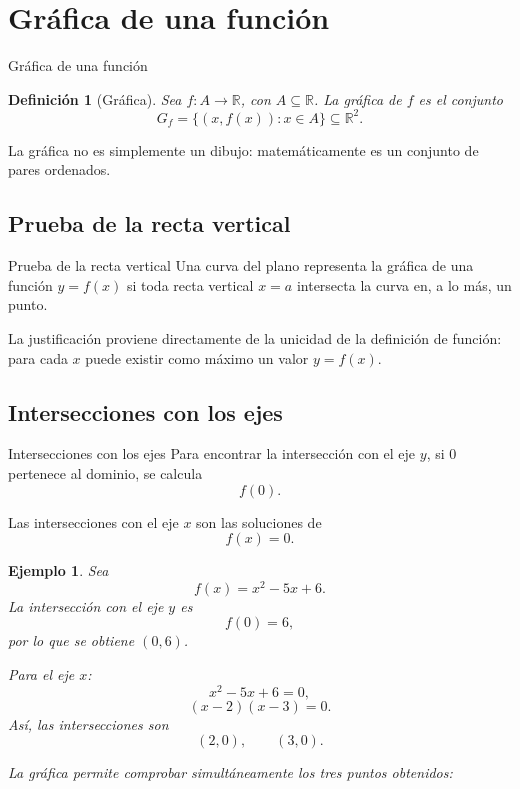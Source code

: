 \documentclass[aspectratio=169,10pt]{beamer}
\newtheorem{definicion}{Definición}
\newtheorem{ejemplo}{Ejemplo}
\newcommand{\R}{\mathbb{R}}
\begin{document}
\section{Gráfica de una función}
\begin{frame}{Gráfica de una función}
\begin{definicion}[Gráfica]
Sea $f:A\to\R$, con $A\subseteq\R$. La gráfica de $f$ es el conjunto
\[
G_f=\{(x,f(x)):x\in A\}\subseteq\R^2.
\]
\end{definicion}

La gráfica no es simplemente un dibujo: matemáticamente es un conjunto de
pares ordenados.
\end{frame}
\subsection*{Prueba de la recta vertical}
\begin{frame}{Prueba de la recta vertical}
Una curva del plano representa la gráfica de una función $y=f(x)$ si toda
recta vertical $x=a$ intersecta la curva en, a lo más, un punto.

La justificación proviene directamente de la unicidad de la definición de
función: para cada $x$ puede existir como máximo un valor $y=f(x)$.
\end{frame}
\subsection*{Intersecciones con los ejes}
\begin{frame}{Intersecciones con los ejes}
Para encontrar la intersección con el eje $y$, si $0$ pertenece al dominio, se
calcula
\[
f(0).
\]

Las intersecciones con el eje $x$ son las soluciones de
\[
f(x)=0.
\]

\begin{ejemplo}
Sea
\[
f(x)=x^2-5x+6.
\]
La intersección con el eje $y$ es
\[
f(0)=6,
\]
por lo que se obtiene $(0,6)$.

Para el eje $x$:
\[
x^2-5x+6=0,
\]
\[
(x-2)(x-3)=0.
\]
Así, las intersecciones son
\[
(2,0),\qquad(3,0).
\]

La gráfica permite comprobar simultáneamente los tres puntos obtenidos:
\begin{center}
\end{center}
\end{ejemplo}

\end{frame}
\end{document}
